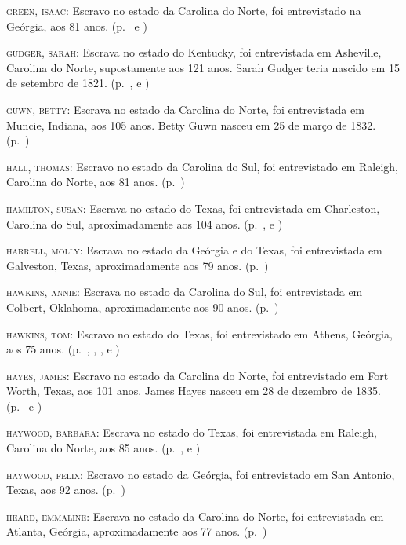 \begin{Parskip}
\textsc{green, isaac:} Escravo no estado da Carolina do Norte, foi
entrevistado na Geórgia, aos 81 anos. (p.~\pageref{ref112} e \pageref{ref113})

\textsc{gudger, sarah:} Escrava no estado do Kentucky, foi entrevistada
em Asheville, Carolina do Norte, supostamente aos 121 anos. Sarah Gudger
teria nascido em 15 de setembro de 1821. (p.~\pageref{ref114}, \pageref{ref115} e \pageref{ref116})

\textsc{guwn, betty:} Escrava no estado da Carolina do Norte, foi
entrevistada em Muncie, Indiana, aos 105 anos. Betty Guwn nasceu em 25
de março de 1832. (p.~\pageref{ref117})

\textsc{hall, thomas:} Escravo no estado da Carolina do Sul, foi
entrevistado em Raleigh, Carolina do Norte, aos 81 anos. (p.~\pageref{ref118})

\textsc{hamilton, susan:} Escrava no estado do Texas, foi entrevistada
em Charleston, Carolina do Sul, aproximadamente aos 104 anos. (p.~\pageref{ref119}, \pageref{ref120} e \pageref{ref121})

\textsc{harrell, molly:} Escrava no estado da Geórgia e do Texas, foi
entrevistada em Galveston, Texas, aproximadamente aos 79 anos. (p.~\pageref{ref122})

\textsc{hawkins, annie:} Escrava no estado da Carolina do Sul, foi
entrevistada em Colbert, Oklahoma, aproximadamente aos 90 anos. (p.~\pageref{ref123})

\textsc{hawkins, tom:} Escravo no estado do Texas, foi entrevistado em
Athens, Geórgia, aos 75 anos. (p.~\pageref{ref124}, \pageref{ref125}, \pageref{ref126}, \pageref{ref127} e \pageref{ref128})

\textsc{hayes, james:} Escravo no estado da Carolina do Norte, foi
entrevistado em Fort Worth, Texas, aos 101 anos. James Hayes nasceu em
28 de dezembro de 1835. (p.~\pageref{ref129} e \pageref{ref130})


\textsc{haywood, barbara:} Escrava no estado do Texas, foi entrevistada
em Raleigh, Carolina do Norte, aos 85 anos. (p.~\pageref{ref131}, \pageref{ref132} e \pageref{ref133})

\textsc{haywood, felix:} Escravo no estado da Geórgia, foi entrevistado
em San Antonio, Texas, aos 92 anos. (p.~\pageref{ref134})

\textsc{heard, emmaline:} Escrava no estado da Carolina do Norte, foi
entrevistada em Atlanta, Geórgia, aproximadamente aos 77 anos. (p.~\pageref{ref135})


\end{Parskip}
